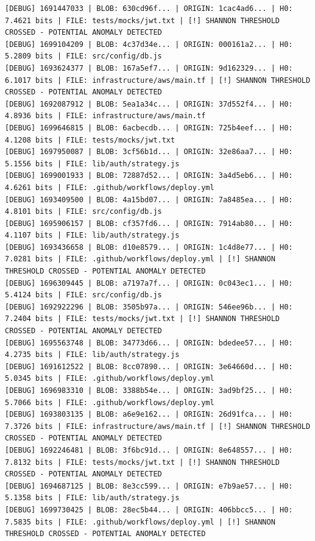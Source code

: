 \documentclass[12pt, a4paper, oneside]{report}
\begin{document}
\begin{lstlisting}[basicstyle=\tiny\ttfamily]
[DEBUG] 1691447033 | BLOB: 630cd96f... | ORIGIN: 1cac4ad6... | H0: 7.4621 bits | FILE: tests/mocks/jwt.txt | [!] SHANNON THRESHOLD CROSSED - POTENTIAL ANOMALY DETECTED
[DEBUG] 1699104209 | BLOB: 4c37d34e... | ORIGIN: 000161a2... | H0: 5.2809 bits | FILE: src/config/db.js
[DEBUG] 1693624377 | BLOB: 167a5ef7... | ORIGIN: 9d162329... | H0: 6.1017 bits | FILE: infrastructure/aws/main.tf | [!] SHANNON THRESHOLD CROSSED - POTENTIAL ANOMALY DETECTED
[DEBUG] 1692087912 | BLOB: 5ea1a34c... | ORIGIN: 37d552f4... | H0: 4.8936 bits | FILE: infrastructure/aws/main.tf
[DEBUG] 1699646815 | BLOB: 6acbecdb... | ORIGIN: 725b4eef... | H0: 4.1208 bits | FILE: tests/mocks/jwt.txt
[DEBUG] 1697950087 | BLOB: 3cf56b1d... | ORIGIN: 32e86aa7... | H0: 5.1556 bits | FILE: lib/auth/strategy.js
[DEBUG] 1699001933 | BLOB: 72887d52... | ORIGIN: 3a4d5eb6... | H0: 4.6261 bits | FILE: .github/workflows/deploy.yml
[DEBUG] 1693409500 | BLOB: 4a15bd07... | ORIGIN: 7a8485ea... | H0: 4.8101 bits | FILE: src/config/db.js
[DEBUG] 1695906157 | BLOB: cf357fd6... | ORIGIN: 7914ab80... | H0: 4.1107 bits | FILE: lib/auth/strategy.js
[DEBUG] 1693436658 | BLOB: d10e8579... | ORIGIN: 1c4d8e77... | H0: 7.0281 bits | FILE: .github/workflows/deploy.yml | [!] SHANNON THRESHOLD CROSSED - POTENTIAL ANOMALY DETECTED
[DEBUG] 1696309445 | BLOB: a7197a7f... | ORIGIN: 0c043ec1... | H0: 5.4124 bits | FILE: src/config/db.js
[DEBUG] 1692922296 | BLOB: 3505b97a... | ORIGIN: 546ee96b... | H0: 7.2404 bits | FILE: tests/mocks/jwt.txt | [!] SHANNON THRESHOLD CROSSED - POTENTIAL ANOMALY DETECTED
[DEBUG] 1695563748 | BLOB: 34773d66... | ORIGIN: bdedee57... | H0: 4.2735 bits | FILE: lib/auth/strategy.js
[DEBUG] 1691612522 | BLOB: 8cc07890... | ORIGIN: 3e64660d... | H0: 5.0345 bits | FILE: .github/workflows/deploy.yml
[DEBUG] 1696983310 | BLOB: 3388b54e... | ORIGIN: 3ad9bf25... | H0: 5.7066 bits | FILE: .github/workflows/deploy.yml
[DEBUG] 1693803135 | BLOB: a6e9e162... | ORIGIN: 26d91fca... | H0: 7.3726 bits | FILE: infrastructure/aws/main.tf | [!] SHANNON THRESHOLD CROSSED - POTENTIAL ANOMALY DETECTED
[DEBUG] 1692246481 | BLOB: 3f6bc91d... | ORIGIN: 8e648557... | H0: 7.8132 bits | FILE: tests/mocks/jwt.txt | [!] SHANNON THRESHOLD CROSSED - POTENTIAL ANOMALY DETECTED
[DEBUG] 1694687125 | BLOB: 8e3cc599... | ORIGIN: e7b9ae57... | H0: 5.1358 bits | FILE: lib/auth/strategy.js
[DEBUG] 1699730425 | BLOB: 28ec5b44... | ORIGIN: 406bbcc5... | H0: 7.5835 bits | FILE: .github/workflows/deploy.yml | [!] SHANNON THRESHOLD CROSSED - POTENTIAL ANOMALY DETECTED

\end{lstlisting}
\end{document}

